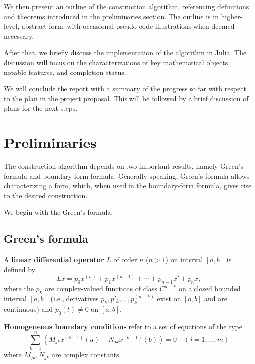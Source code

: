 \documentclass[11pt, oneside, a4paper]{article}
\begin{document}
We then present an outline of the construction algorithm, referencing definitions and theorems introduced in the preliminaries section. The outline is in higher-level, abstract form, with occasional pseudo-code illustrations when deemed necessary. 

After that, we briefly discuss the implementation of the algorithm in Julia. The discussion will focus on the characterizations of key mathematical objects, notable features, and completion status.

We will conclude the report with a summary of the progress so far with respect to the plan in the project proposal. This will be followed by a brief discussion of plans for the next steps.

\section{Preliminaries\cite{CoddingtonLevinson}}

The construction algorithm depends on two important results, namely Green's formula and boundary-form formula. Generally speaking, Green's formula allows characterizing a form, which, when used in the boundary-form formula, gives rise to the desired construction. 

We begin with the Green's formula.

\subsection{Green's formula}
\begin{defn}\label{defn:linear differential operator}
    A \textbf{linear differential operator} $L$ of order $n$ ($n>1$) on interval $[a,b]$ is defined by
    \[Lx = p_0x^{(n)} + p_1x^{(n-1)} + \cdots + p_{n-1}x' + p_nx,\]
    where the $p_k$ are complex-valued functions of class $C^{n-k}$ on a closed bounded interval $[a,b]$ (i.e., derivatives $p_k, p'_k, \ldots, p^{(n-k)}_k$ exist on $[a,b]$ and are continuous) and $p_0(t)\neq 0$ on $[a,b]$.
\end{defn}

\begin{defn}\label{defn:homogeneous boundary conditions}
    \textbf{Homogeneous boundary conditions} refer to a set of equations of the type
    \begin{equation}\label{eq:homogeneous boundary conditions}
        \sum_{k=1}^n (M_{jk}x^{(k-1)}(a) + N_{jk}x^{(k-1)}(b))=0 \quad (j=1,\ldots,m) 
    \end{equation}
    where $M_{jk}, N_{jk}$ are complex constants.
\end{defn}
\end{document}
